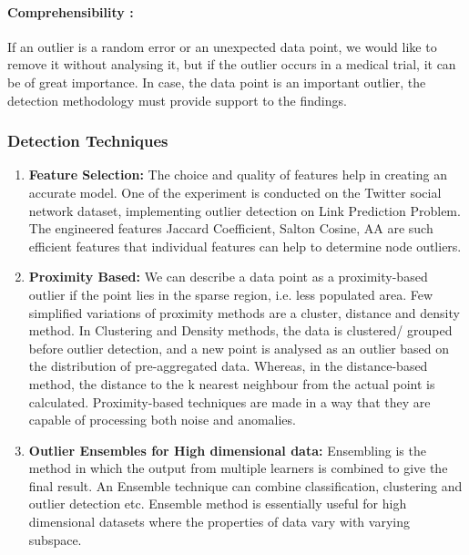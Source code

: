 \documentclass[runningheads]{llncs}
\begin{document}
\paragraph*{Comprehensibility :} If an outlier is a random error or an unexpected data point, we would like to remove it without analysing it, but if the outlier occurs in a medical trial, it can be of great importance. In case, the data point is an important outlier, the detection methodology must provide support to the findings. 

\subsubsection{Detection Techniques}
\begin{enumerate}
    \item \textbf{Feature Selection:} The choice and quality of features help in creating an accurate model. One of the experiment is conducted on the Twitter social network dataset, implementing outlier detection on Link Prediction Problem. The engineered features Jaccard Coefficient, Salton Cosine, AA are such efficient features that individual features can help to determine node outliers. \\
    
    \item \textbf{Proximity Based:}  We can describe a data point as a proximity-based outlier if the point lies in the sparse region, i.e. less populated area. Few simplified variations of proximity methods are a cluster, distance and density method. In Clustering and Density methods, the data is clustered/ grouped before outlier detection, and a new point is analysed as an outlier based on the distribution of pre-aggregated data. Whereas, in the distance-based method, the distance to the k nearest neighbour from the actual point is calculated. Proximity-based techniques are made in a way that they are capable of processing both noise and anomalies. \\
    
    \item \textbf{Outlier Ensembles for High dimensional data:} Ensembling is the method in which the output from multiple learners is combined to give the final result. An Ensemble technique can combine classification, clustering and outlier detection etc. Ensemble method is essentially useful for high dimensional datasets where the properties of data vary with varying subspace. \\
    

\end{enumerate}
\end{document}

